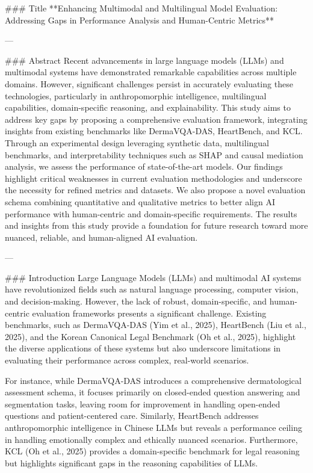 ### Title
**Enhancing Multimodal and Multilingual Model Evaluation: Addressing Gaps in Performance Analysis and Human-Centric Metrics**

---

### Abstract
Recent advancements in large language models (LLMs) and multimodal systems have demonstrated remarkable capabilities across multiple domains. However, significant challenges persist in accurately evaluating these technologies, particularly in anthropomorphic intelligence, multilingual capabilities, domain-specific reasoning, and explainability. This study aims to address key gaps by proposing a comprehensive evaluation framework, integrating insights from existing benchmarks like DermaVQA-DAS, HeartBench, and KCL. Through an experimental design leveraging synthetic data, multilingual benchmarks, and interpretability techniques such as SHAP and causal mediation analysis, we assess the performance of state-of-the-art models. Our findings highlight critical weaknesses in current evaluation methodologies and underscore the necessity for refined metrics and datasets. We also propose a novel evaluation schema combining quantitative and qualitative metrics to better align AI performance with human-centric and domain-specific requirements. The results and insights from this study provide a foundation for future research toward more nuanced, reliable, and human-aligned AI evaluation.

---

### Introduction
Large Language Models (LLMs) and multimodal AI systems have revolutionized fields such as natural language processing, computer vision, and decision-making. However, the lack of robust, domain-specific, and human-centric evaluation frameworks presents a significant challenge. Existing benchmarks, such as DermaVQA-DAS (Yim et al., 2025), HeartBench (Liu et al., 2025), and the Korean Canonical Legal Benchmark (Oh et al., 2025), highlight the diverse applications of these systems but also underscore limitations in evaluating their performance across complex, real-world scenarios.

For instance, while DermaVQA-DAS introduces a comprehensive dermatological assessment schema, it focuses primarily on closed-ended question answering and segmentation tasks, leaving room for improvement in handling open-ended questions and patient-centered care. Similarly, HeartBench addresses anthropomorphic intelligence in Chinese LLMs but reveals a performance ceiling in handling emotionally complex and ethically nuanced scenarios. Furthermore, KCL (Oh et al., 2025) provides a domain-specific benchmark for legal reasoning but highlights significant gaps in the reasoning capabilities of LLMs.

